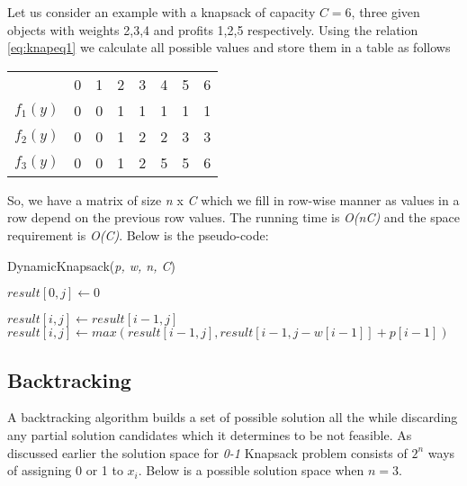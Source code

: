 \documentclass{article}
\begin{document}
Let us consider an example with a knapsack of capacity $C = 6$, three given objects with weights 2,3,4 and profits 1,2,5 respectively. Using the relation \ref{eq:knapeq1} we calculate all possible values and store them in a table as follows
\begin{center}
	\begin{tabular}{*8c}
		& 0 &1 &2 &3 &4 &5 &6 \\\cline{2-8}
		$f_{1}(y)$ &\multicolumn{1}{|c|}{0} &\multicolumn{1}{|c|}{0} &\multicolumn{1}{|c|}{1} &\multicolumn{1}{|c|}{1} &\multicolumn{1}{|c|}{1} &\multicolumn{1}{|c|}{1} &\multicolumn{1}{|c|}{1} \\\cline{2-8}
		$f_{2}(y)$ &\multicolumn{1}{|c|}{0} &\multicolumn{1}{|c|}{0} &\multicolumn{1}{|c|}{1} &\multicolumn{1}{|c|}{2} &\multicolumn{1}{|c|}{2} &\multicolumn{1}{|c|}{3} &\multicolumn{1}{|c|}{3} \\\cline{2-8}
		$f_{3}(y)$ &\multicolumn{1}{|c|}{0} &\multicolumn{1}{|c|}{0} &\multicolumn{1}{|c|}{1} &\multicolumn{1}{|c|}{2} &\multicolumn{1}{|c|}{5} &\multicolumn{1}{|c|}{5} &\multicolumn{1}{|c|}{6} \\\cline{2-8}
	\end{tabular}
\end{center}
So, we have a matrix of size \textit{n} x \textit{C} which we fill in row-wise manner as values in a row depend on the previous row values. The running time is \textit{O(nC)} and the space requirement is \textit{O(C)}. Below is the pseudo-code:

\begin{algorithm}
	\caption{DynamicKnapsack(\textit{p, w, n, C})}\label{dynamicKnapsack}
	\begin{algorithmic}[1]
			\State $result[0, j]\gets 0$
		\EndFor
		
					\State $result[i, j]\gets result[i-1, j]$
				\Else
					\State $result[i, j]\gets max(result[i-1, j], result[i-1, j-w[i-1]] + p[i-1])$
				\EndIf
			\EndFor
		\EndFor
	\end{algorithmic}
\end{algorithm}

\subsection{Backtracking}
A backtracking algorithm builds a set of possible solution all the while discarding any partial solution candidates which it determines to be not feasible. As discussed earlier the solution space for \textit{0-1} Knapsack problem consists of $2^{n}$ ways of assigning 0 or 1 to $x_{i}$. Below is a possible solution space when $n=3$.
\end{document}
